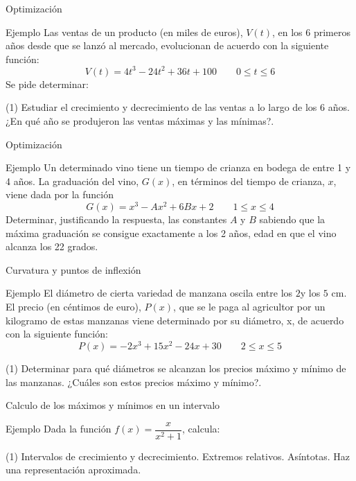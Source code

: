 \documentclass[8pt]{beamer}
\begin{document}
\begin{frame}[t]{Optimización}
\begin{exampleblock}{Ejemplo}
Las ventas de un producto (en miles de euros), $V(t)$, en los 6 primeros años desde que se lanzó al mercado, evolucionan de acuerdo con la siguiente función:
\[ V(t)=4t^3-24t^2 +36t+100 \qquad 0 \leq t \leq 6 \]
Se pide determinar:
\begin{tasks}[label=\alph*)](1)
\task Estudiar el crecimiento y decrecimiento de las ventas a lo largo de los 6 años.
\task ¿En qué año se produjeron las ventas máximas y las mínimas?.
\end{tasks}
\end{exampleblock}
\end{frame}


\begin{frame}[t]{Optimización}
\begin{exampleblock}{Ejemplo}
Un determinado vino tiene un tiempo de crianza en bodega de entre 1 y 4 años. La graduación del vino, $G(x)$, en términos del tiempo de crianza, $x$, viene dada por la función
\[ G(x)= x^3-Ax^2+6Bx+2 \qquad 1 \leq x \leq 4 \]
Determinar, justificando la respuesta, las constantes $A$ y $B$ sabiendo que la máxima graduación se consigue exactamente a los 2 años, edad en que el vino alcanza los 22 grados.


\end{exampleblock}
\end{frame}

\begin{frame}[t]{Curvatura y puntos de inflexión}
\begin{exampleblock}{Ejemplo}
El diámetro de cierta variedad de manzana oscila entre los $2$y los $5$ cm. El precio (en céntimos de euro), $P(x)$, que se le paga al agricultor por un kilogramo de estas manzanas viene determinado por su diámetro, x, de acuerdo con la siguiente función:
\[ P(x)=-2x^3+15x^2-24x+30 \qquad 2 \leq x \leq 5 \]
\begin{tasks}[label=\alph*)](1)
\task Determinar para qué diámetros se alcanzan los precios máximo y mínimo de las manzanas. 
\task ¿Cuáles son estos precios máximo y mínimo?.
\end{tasks}

\end{exampleblock}
\end{frame}

\begin{frame}[t]{Calculo de los máximos y mínimos en un intervalo}
\begin{exampleblock}{Ejemplo}
Dada la función $f(x)=\dfrac{x}{x^2+1}$, calcula:
\begin{tasks}[label=\alph*)](1)
\task Intervalos de crecimiento y decrecimiento.
\task Extremos relativos.
\task Asíntotas.
\task Haz una representación aproximada.
\end{tasks}
\end{exampleblock}
\end{frame}
\end{document}
